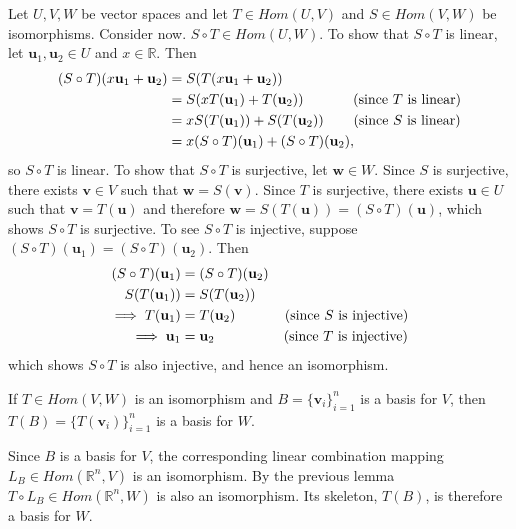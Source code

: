 \documentclass[12pt,letterpaper,reqno]{article}
\numberwithin{equation}{section}
\newcommand{\bv}{\mathbf{v}}
\newcommand{\bw}{\mathbf{w}}
\newcommand{\bu}{\mathbf{u}}
\begin{document}
\begin{pf} 
	Let $U,V,W$ be vector spaces and let $T\in Hom(U,V)$ and $S \in Hom(V,W)$ be isomorphisms. Consider now. $S \circ T \in Hom(U,W)$. To show that $S \circ T$ is linear, let $\bu_1, \bu_2 \in U$ and $x \in \mathbb{R}$. Then
	\begin{align*}
		(S \circ T)(x\bu_1+\bu_2)&=S(T(x\bu_1+\bu_2)) \\
		&=S(xT(\bu_1)+T(\bu_2)) \hspace{1.25cm} \text{(since $T$ is linear)}\\
		&=xS(T(\bu_1))+S(T(\bu_2)) \hspace{0.75cm} \text{(since $S$ is linear)} \\
		&=x(S \circ T)(\bu_1)+(S \circ T)(\bu_2),
	\end{align*}
so $S \circ T$ is linear. To show that $S \circ T$ is surjective, let $\bw \in W$. Since $S$ is surjective, there exists $\bv \in V$ such that $\bw=S(\bv)$. Since $T$ is surjective, there exists $\bu \in U$ such that $\bv=T(\bu)$ and therefore $\bw=S(T(\bu))=(S\circ T)(\bu)$, which shows $S \circ T$ is surjective. To see $S \circ T$ is injective, suppose $(S \circ T)(\bu_1)=(S \circ T)(\bu_2)$. Then
\begin{align*}
	(S \circ T)(\bu_1)&=(S \circ T)(\bu_2) \\
	S(T(\bu_1))&=S(T(\bu_2)) \\
	\implies T(\bu_1)&=T(\bu_2) \hspace{1.25cm} \text{(since $S$ is injective)} \\
	\implies \bu_1 &=\bu_2 \hspace{1.75cm} \text{(since $T$ is injective)} \\
\end{align*}
which shows $S \circ T$ is also injective, and  hence an isomorphism.
\end{pf}

\begin{thm}
	If $T \in Hom(V,W)$ is an isomorphism and $B=\{\bv_i\}_{i=1}^n$ is a basis for $V$, then $T(B)=\{T(\bv_i)\}_{i=1}^n$ is a basis for $W$. 
\end{thm}

\begin{pf}
	Since $B$ is a basis for $V$, the corresponding linear combination mapping $L_B \in Hom(\mathbb{R}^n,V)$ is an isomorphism. By the previous lemma $T \circ L_B \in Hom(\mathbb{R}^n,W)$ is also an isomorphism. Its skeleton, $T(B)$, is therefore a basis for $W$.
\end{pf}
\end{document}
